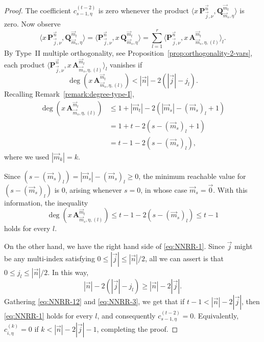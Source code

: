 \documentclass[10pt,a4paper]{amsart}
\begin{document}
\begin{proof}
        The coefficient $c^{(t-2)}_{s-1,\eta}$ is zero whenever the product $\langle x\, \mathbf P_{\vec j,\nu}^{\vec n}, \mathbf Q^{\vec m_t}_{\vec m_s,\eta}\rangle$ is zero. Now observe
        $$
        \langle x\, \mathbf P_{\vec j,\nu}^{\vec n}, \mathbf Q^{\vec m_t}_{\vec m_s,\eta}\rangle = \langle \mathbf P_{\vec j,\nu}^{\vec n}, x\, \mathbf Q^{\vec m_{t}}_{\vec m_{s},\eta}\rangle = \sum_{l=1}^r \langle \mathbf P_{\vec j,\nu}^{\vec n}, x\, \mathbf A^{\vec m_{t}}_{\vec m_{s},\eta,(l)}\rangle_l. 
        $$
        By Type~II multiple orthogonality, see Proposition~\ref{prop:orthogonality-2-vars}, each product $\langle \mathbf P_{\vec j,\nu}^{\vec n}, x\, \mathbf A^{\vec m_{t}}_{\vec m_{s},\eta,(l)}\rangle_l$ vanishes if 
        \begin{equation}
            \label{eq:NNRR-1}
        \deg( x\, \mathbf A^{\vec m_{t}}_{\vec m_{s},\eta,(l)})<|\vec n|-2(|\vec j|-j_l).
        \end{equation}
        Recalling Remark~\ref{remark:degree-type-I},  
        \begin{equation*}
            \begin{aligned}
                \deg(x\, \mathbf A^{\vec m_{t}}_{\vec m_{s},\eta,(l)})&\leq  1 + |\vec m_t|-2(|\vec m_s|-(\vec m_s)_l+1) \\ 
                &=1+t-2(s-(\vec m_{s})_l+1)\\&=t-1-2(s-(\vec m_{s})_l),
            \end{aligned}
        \end{equation*}
        where we used $|\vec m_k|=k$.
          
        Since $(s-(\vec m_{s})_l)=|\vec m_{s}|-(\vec m_{s})_l\geq 0$, the minimum reachable value for $(s-(\vec m_{s})_l)$ is $0$, arising whenever $s=0$, in whose case $\vec m_{s}=\vec 0$. With this information, the inequality 
        \begin{equation}
            \label{eq:NNRR-12}
            \deg( x\, \mathbf A^{\vec m_{t}}_{\vec m_{s},\eta,(l)})\leq t-1-2(s-(\vec m_{s})_l) \leq t-1
        \end{equation}
        holds for every $l$.
        
        On the other hand, we have the right hand side of \eqref{eq:NNRR-1}. Since $\vec j$ might be any multi-index satisfying $0\leq |\vec j|\leq|\vec n|/2$, all we can assert is that $0\leq j_l\leq|\vec n|/2$. In this way, 
        \begin{equation}
            \label{eq:NNRR-3}
            |\vec n|-2(|\vec j|-j_l) \geq |\vec n|-2|\vec j|.
        \end{equation}
        Gathering \eqref{eq:NNRR-12} and \eqref{eq:NNRR-3}, we get that if $t-1<|\vec n|-2|\vec j|$, then \eqref{eq:NNRR-1} holds for every $l$, and consequently $c^{(t-2)}_{s-1,\eta}=0$. Equivalently, $c^{(k)}_{i,\eta}=0$ if $k<|\vec n|-2|\vec j|-1$, completing the proof.

        
        
    \end{proof}
\end{document}
